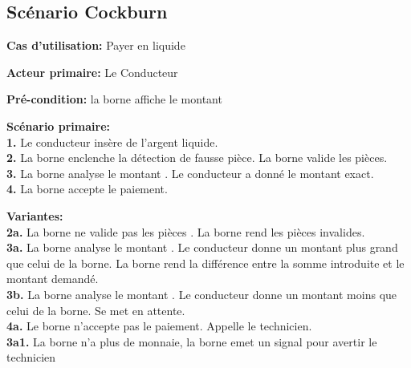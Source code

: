 \subsection{Scénario Cockburn}
\textbf{Cas d'utilisation:} Payer en liquide

\textbf{Acteur primaire:} Le Conducteur

\textbf{Pré-condition: } la borne affiche le montant
 

\textbf{Scénario primaire: } \\
    \textbf{1.} Le conducteur insère de l’argent liquide.\\
    \textbf{2.}  La borne enclenche la détection de fausse pièce. La borne valide les pièces.\\
    \textbf{3.} La borne analyse le montant . Le conducteur a donné le montant exact.\\
    \textbf{4.} La borne accepte le paiement.

\textbf{Variantes:}\\
    \textbf{2a.} La borne ne valide pas les pièces . La borne rend les pièces invalides.\\
    \textbf{3a.} La borne analyse le montant . Le conducteur donne un montant plus grand que celui de la borne. La borne rend la différence entre la somme introduite et le montant demandé.\\
    \textbf{3b.} La borne analyse le montant . Le conducteur donne un montant moins que celui de la borne. Se met en attente.\\
    \textbf{4a.} Le borne n’accepte pas le paiement. Appelle le technicien. \\
    \textbf{3a1.} La borne n’a plus de monnaie, la borne emet un signal pour avertir le technicien
\\
    
\newpage
